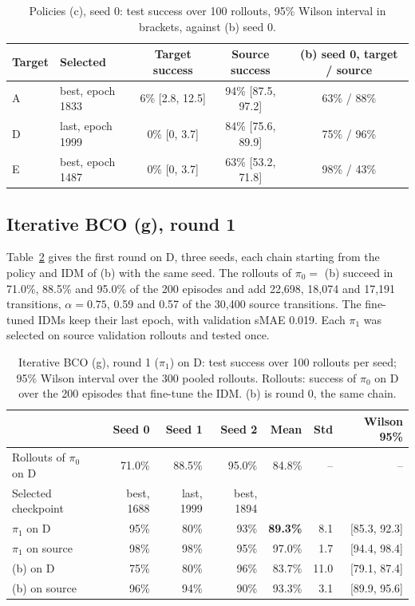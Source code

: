 \documentclass{article}
\begin{document}
\begin{table}[t]
  \caption{Policies (c), seed 0: test success over 100 rollouts, 95\% Wilson interval in
  brackets, against (b) seed 0.}
  \label{tab:danpolicy}
  \centering
  \small
  \begin{tabular}{@{}llccc@{}}
    \toprule
    Target & Selected & Target success & Source success & (b) seed 0, target / source \\
    \midrule
    A & best, epoch 1833 & 6\% [2.8, 12.5] & 94\% [87.5, 97.2] & 63\% / 88\% \\
    D & last, epoch 1999 & 0\% [0, 3.7] & 84\% [75.6, 89.9] & 75\% / 96\% \\
    E & best, epoch 1487 & 0\% [0, 3.7] & 63\% [53.2, 71.8] & 98\% / 43\% \\
    \bottomrule
  \end{tabular}
\end{table}

\subsection{Iterative BCO (g), round 1}
\label{sec:bco}
Table~\ref{tab:bco} gives the first round on D, three seeds, each chain starting from the
policy and IDM of (b) with the same seed. The rollouts of $\pi_0 = $ (b) succeed in 71.0\%,
88.5\% and 95.0\% of the 200 episodes and add 22,698, 18,074 and 17,191 transitions,
$\alpha = 0.75$, 0.59 and 0.57 of the 30,400 source transitions. The fine-tuned IDMs keep
their last epoch, with validation sMAE 0.019. Each $\pi_1$ was selected on source
validation rollouts and tested once.

\begin{table}[t]
  \caption{Iterative BCO (g), round 1 ($\pi_1$) on D: test success over 100 rollouts per
  seed; 95\% Wilson interval over the 300 pooled rollouts. Rollouts: success of $\pi_0$
  on D over the 200 episodes that fine-tune the IDM. (b) is round 0, the same chain.}
  \label{tab:bco}
  \centering
  \small
  \begin{tabular}{@{}lrrrrrr@{}}
    \toprule
    & Seed 0 & Seed 1 & Seed 2 & Mean & Std & Wilson 95\% \\
    \midrule
    Rollouts of $\pi_0$ on D & 71.0\% & 88.5\% & 95.0\% & 84.8\% & -- & -- \\
    Selected checkpoint & best, 1688 & last, 1999 & best, 1894 & & & \\
    $\pi_1$ on D & 95\% & 80\% & 93\% & \textbf{89.3\%} & 8.1 & [85.3, 92.3] \\
    $\pi_1$ on source & 98\% & 98\% & 95\% & 97.0\% & 1.7 & [94.4, 98.4] \\
    (b) on D & 75\% & 80\% & 96\% & 83.7\% & 11.0 & [79.1, 87.4] \\
    (b) on source & 96\% & 94\% & 90\% & 93.3\% & 3.1 & [89.9, 95.6] \\
    \bottomrule
  \end{tabular}
\end{table}
\end{document}
